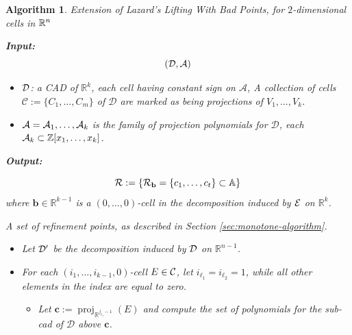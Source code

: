 \documentclass[
]{book}
\newtheorem{algorithm}{Algorithm}
\theoremstyle{definition}
\theoremstyle{definition}
\theoremstyle{definition}
\theoremstyle{definition}
\theoremstyle{remark}
\begin{document}
\begin{algorithm}Extension of Lazard's Lifting With Bad Points, for $2$-dimensional cells in $\mathbb{R}^n$

\citep[Extension of][Algorithm 5.15]{lazard10}

\textbf{Input:}
\[({\cal D}, {\cal A})\]

\begin{itemize}
\item
  \(\cal D\): a CAD of \(\mathbb{R}^k\), each cell having constant sign on \(\mathcal{A}\), A collection of cells \(\mathcal{C} := \{ C_1,\ldots,C_m \}\) of \(\mathcal{D}\) are marked as being projections of \(V_1,\ldots,V_k\).
\item
  \({\cal A} = {\cal A}_1,\ldots,{\cal A}_k\) is the family of projection polynomials for \(\mathcal{D}\), each \({\cal A}_k \subset \mathbb{Z}[x_1,\ldots,x_k]\).
\end{itemize}

\textbf{Output:}

\[
{\cal R} := \{ {\cal R}_{\mathbf{b}} = \{ c_1,\ldots,c_t \} \subset \mathbb{A}\}
\]
where \(\mathbf{b} \in \mathbb{R}^{k-1}\) is a \((0,\ldots,0)\)-cell in the decomposition induced by \({\cal E}\) on \(\mathbb{R}^k\).

A set of refinement points, as described in Section \ref{sec:monotone-algorithm}.

\begin{itemize}
\item
  Let \(\cal D'\) be the decomposition induced by \(\cal D\) on \(\mathbb{R}^{n-1}\).
\item
  For each \((i_1,\ldots,i_{k-1},0)\)-cell \(E \in \cal{C}\), let \(i_{\ell_1} = i_{\ell_2} = 1\), while all other elements in the index are equal to zero.

  \begin{itemize}
  \item
    Let \(\mathbf{c} := {\operatorname{proj}_{\mathbb{R}^{j_{\ell_1} - 1}}}(E)\) and compute the set of polynomials for the sub-cad of \(\mathcal{D}\) above \(\mathbf{c}\).


\end{itemize}
\end{itemize}
\end{algorithm}
\end{document}
